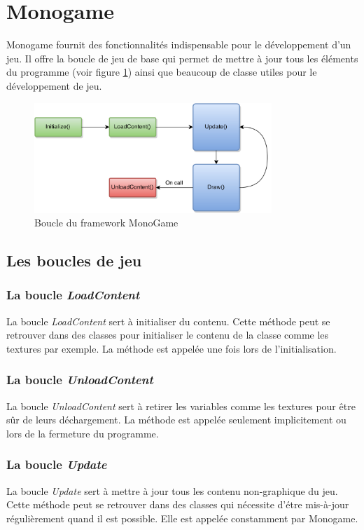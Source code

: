\documentclass[11pt, a4paper, oneside]{report}
\begin{document}
\section{Monogame}
Monogame fournit des fonctionnalités indispensable pour le développement d'un jeu. Il offre la boucle de jeu de base qui permet de mettre à jour tous les éléments du programme (voir figure \ref{fig:loopmg}) ainsi que beaucoup de classe utiles pour le développement de jeu.
\begin{figure}[H]
	\begin{center}
	\includegraphics[width=0.8\textwidth]{loopmg}
	\caption{Boucle du framework MonoGame}
	\label{fig:loopmg}
	\end{center}
\end{figure}
\subsection{Les boucles de jeu}
\subsubsection{La boucle \textit{LoadContent}}
La boucle \textit{LoadContent} sert à initialiser du contenu. Cette méthode peut se retrouver dans des classes pour initialiser le contenu de la classe comme les textures par exemple. La méthode est appelée une fois lors de l'initialisation.
\subsubsection{La boucle \textit{UnloadContent}}
La boucle \textit{UnloadContent} sert à retirer les variables comme les textures pour être sûr de leurs déchargement. La méthode est appelée seulement implicitement ou lors de la fermeture du programme.
\subsubsection{La boucle \textit{Update}}
La boucle \textit{Update} sert à mettre à jour tous les contenu non-graphique du jeu. Cette méthode peut se retrouver dans des classes qui nécessite d'étre mis-à-jour régulièrement quand il est possible. Elle est appelée constamment par Monogame.
\end{document}
